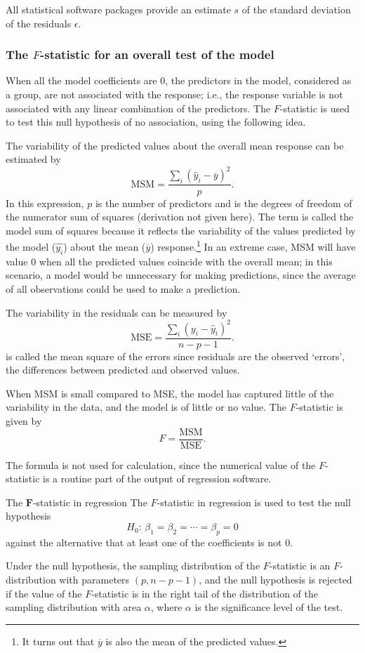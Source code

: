 All statistical software packages provide an estimate $s$ of the standard deviation of the residuals $\epsilon$.


\subsubsection{The $F$-statistic for an overall test of the model}

When all the model coefficients are 0, the predictors in the model, considered as a group, are not associated with the response; i.e., the response variable is not associated with any linear combination of the predictors. The $F$-statistic is used to test this null hypothesis of no association, using the following idea.  

The variability of the predicted values about the overall mean response can be estimated by
\[
   \text{MSM} =  \frac{\sum_i(\hat{y}_i - \overline{y})^2}{p}.
\]
In this expression, $p$ is the number of predictors and is the degrees of freedom of the numerator sum of squares (derivation not given here).  The term  is called the model sum of squares because it reflects the variability of the values predicted by the model ($\hat{y_i}$) about the mean ($\overline{y}$) response.\footnote{It turns out that $\overline{y}$ is also the mean of the predicted values.} In an extreme case, MSM will have value 0 when all the predicted values coincide with the overall mean; in this scenario, a model would be unnecessary for making predictions, since the average of all observations could be used to make a prediction.

The variability in the residuals can be measured by 
\[
  \text{MSE} = \frac{\sum_i(y_i - \hat{y}_i)^2}{n - p - 1}.
\]
 is called the mean square of the errors since residuals are the observed `errors', the differences between predicted and observed
values.

When MSM is small compared to MSE, the model has captured little of the variability in the data, and the model is of little or no value.  The $F$-statistic is given by
\[
  F = \frac{\text{MSM}}{\text{MSE}}.
\]

The formula is not used for calculation, since the numerical value of the $F$-statistic is a routine part of the output of regression software.

\textD{\newpage}

\begin{onebox}{The $\pmb{F}$-statistic in regression}
The $F$-statistic in regression is used to test the null hypothesis 
\[
  H_0:\, \beta_1 = \beta_2 = \cdots = \beta_p = 0
\]
against the alternative that at least one of the coefficients is not 0.\vspace{3mm}

Under the null hypothesis, the sampling distribution of the $F$-statistic is an $F$-distribution with parameters $(p, n - p - 1)$, and the null hypothesis is rejected if the value of the $F$-statistic is in the right tail of the distribution of the sampling distribution with area $\alpha$, where $\alpha$ is the significance level of the test.
\end{onebox}

